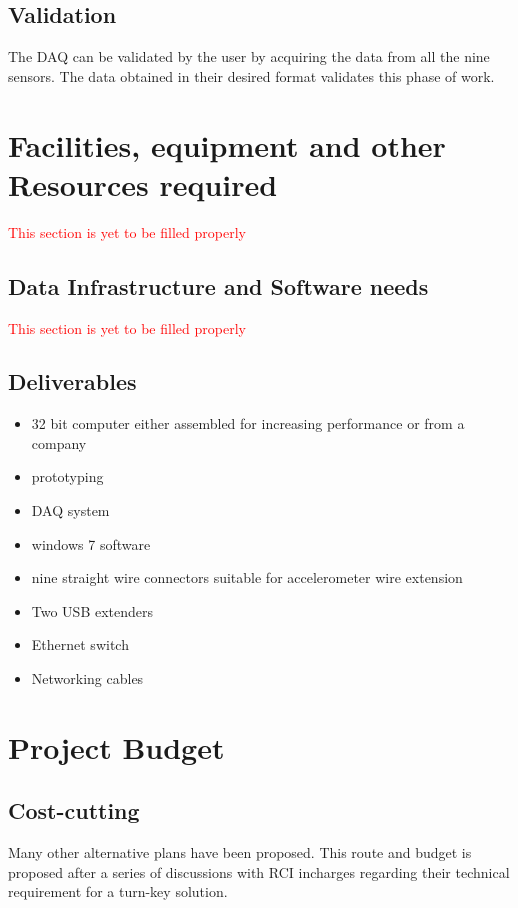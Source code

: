 \documentclass{FR16}
\begin{document}
   \subsection{Validation}
The DAQ can be validated by the user by acquiring the data from all the nine sensors. The data obtained in their desired format validates this phase of work.


\newpage
\section{Facilities, equipment and other Resources required}
\textcolor{red}{This  section is yet to be filled properly}



\subsection{Data Infrastructure and Software needs}
\textcolor{red}{This  section is yet to be filled properly}


\subsection{Deliverables}

\begin{itemize}
    \item 32 bit computer either assembled for increasing performance or from a company
    \item prototyping
    \item DAQ system
    \item windows 7 software
     \item nine straight wire connectors suitable for accelerometer wire extension
    \item Two USB extenders 
    \item Ethernet switch
    \item Networking cables
 \end{itemize}

\section{Project Budget}
 \subsection{Cost-cutting}
Many other alternative plans have been proposed. This route and budget is proposed after a series of discussions with RCI incharges regarding their technical requirement for a turn-key solution.
\end{document}
